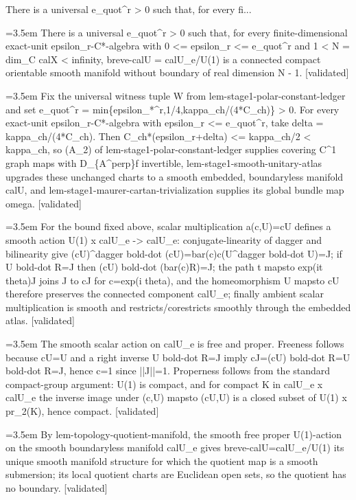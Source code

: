 \documentclass{article}
\newcommand{\step}[1]{\par\noindent\hangindent=3.5em\hangafter=1%
  \makebox[3.5em][l]{\textbf{#1.}}}
\newcommand{\steptag}[1]{\hfill{\small\textsf{[#1]}}}
\begin{document}
\begin{proofbox}{There is a universal e\_quot\textasciicircum{}r > 0 such that, for every fi...}
\step{1} There is a universal e\_quot\textasciicircum{}r > 0 such that, for every finite-dimensional exact-unit epsilon\_r-C*-algebra with 0 <= epsilon\_r <= e\_quot\textasciicircum{}r and 1 < N = dim\_C calX < infinity, breve-calU = calU\_e/U(1) is a connected compact orientable smooth manifold without boundary of real dimension N - 1. \steptag{validated} \\[6pt]
\step{1.1} Fix the universal witness tuple W from lem-stage1-polar-constant-ledger and set e\_quot\textasciicircum{}r = min\{epsilon\_*\textasciicircum{}r,1/4,kappa\_ch/(4*C\_ch)\} > 0. For every exact-unit epsilon\_r-C*-algebra with epsilon\_r <= e\_quot\textasciicircum{}r, take delta = kappa\_ch/(4*C\_ch). Then C\_ch*(epsilon\_r+delta) <= kappa\_ch/2 < kappa\_ch, so (A\_2) of lem-stage1-polar-constant-ledger supplies covering C\textasciicircum{}1 graph maps with D\_\{A\textasciicircum{}perp\}f invertible, lem-stage1-smooth-unitary-atlas upgrades these unchanged charts to a smooth embedded, boundaryless manifold calU, and lem-stage1-maurer-cartan-trivialization supplies its global bundle map omega. \steptag{validated} \\[4pt]
\step{1.2} For the bound fixed above, scalar multiplication a(c,U)=cU defines a smooth action U(1) x calU\_e -> calU\_e: conjugate-linearity of dagger and bilinearity give (cU)\textasciicircum{}dagger bold-dot (cU)=bar(c)c(U\textasciicircum{}dagger bold-dot U)=J; if U bold-dot R=J then (cU) bold-dot (bar(c)R)=J; the path t mapsto exp(it theta)J joins J to cJ for c=exp(i theta), and the homeomorphism U mapsto cU therefore preserves the connected component calU\_e; finally ambient scalar multiplication is smooth and restricts/corestricts smoothly through the embedded atlas. \steptag{validated} \\[4pt]
\step{1.3} The smooth scalar action on calU\_e is free and proper. Freeness follows because cU=U and a right inverse U bold-dot R=J imply cJ=(cU) bold-dot R=U bold-dot R=J, hence c=1 since ||J||=1. Properness follows from the standard compact-group argument: U(1) is compact, and for compact K in calU\_e x calU\_e the inverse image under (c,U) mapsto (cU,U) is a closed subset of U(1) x pr\_2(K), hence compact. \steptag{validated} \\[4pt]
\step{1.4} By lem-topology-quotient-manifold, the smooth free proper U(1)-action on the smooth boundaryless manifold calU\_e gives breve-calU=calU\_e/U(1) its unique smooth manifold structure for which the quotient map is a smooth submersion; its local quotient charts are Euclidean open sets, so the quotient has no boundary. \steptag{validated} \\[4pt]

\end{proofbox}
\end{document}
